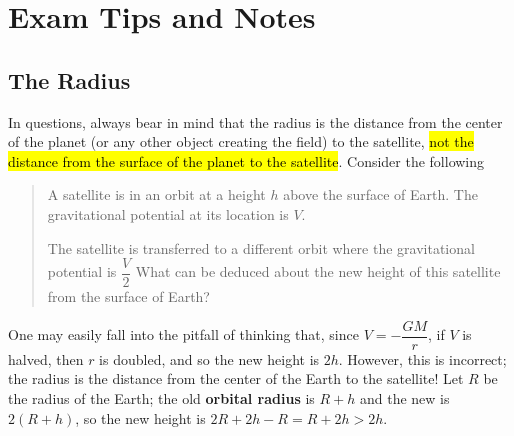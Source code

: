 \documentclass[a4paper,12pt]{article}
\let\oldsection\section
\renewcommand\section{\clearpage\oldsection}
\begin{document}
\pagebreak

\section{Exam Tips and Notes}

\subsection{The Radius}

In questions, always bear in mind that the radius is the distance from the center of the planet (or any other object creating the field) to the satellite, \hl{not the distance from the surface of the planet to the satellite}. Consider the following
\begin{quote}
  A satellite is in an orbit at a height $h$ above the surface of Earth. The gravitational potential at its location is $V$.

  The satellite is transferred to a different orbit where the gravitational potential is $\dfrac{V}{2}$ What can be deduced about the new height of this satellite from the surface of Earth?
\end{quote}
One may easily fall into the pitfall of thinking that, since $V = -\dfrac{GM}{r}$, if $V$ is halved, then $r$ is doubled, and so the new height is $2h$. However, this is incorrect; the radius is the distance from the center of the Earth to the satellite! Let $R$ be the radius of the Earth; the old \textbf{orbital radius} is $R + h$ and the new is $2(R + h)$, so the new height is $2R + 2h - R = R + 2h > 2h$.
\end{document}

